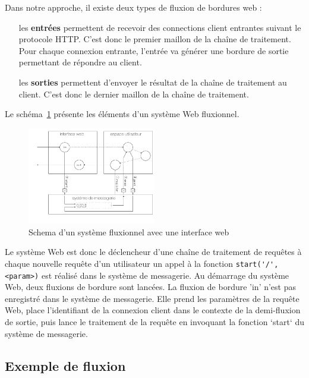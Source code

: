 Dans notre approche, il existe deux types de fluxion de bordures web :

\begin{itemize}
	\item[les \textbf{entrées}]
    permettent de recevoir des connections client entrantes suivant le protocole HTTP.
    C'est donc le premier maillon de la chaîne de traitement.
    Pour chaque connexion entrante, l'entrée va générer une bordure de sortie permettant de répondre au client.
	\item[les \textbf{sorties}]
    permettent d'envoyer le résultat de la chaîne de traitement au client.
    C'est donc le dernier maillon de la chaîne de traitement.
\end{itemize}


Le schéma~\ref{fig:schemaweb} présente les éléments d'un système Web fluxionnel.

\begin{figure}[h!]
	\includegraphics[width=0.5\textwidth]{schema-web.pdf}
	\caption{Schema d'un système fluxionnel avec une interface web}
	\label{fig:schemaweb}
\end{figure}

Le système Web est donc le déclencheur d'une chaîne de traitement de requêtes à chaque nouvelle requête d'un utilisateur un appel à la fonction \lstinline|start('/', <param>)| est réalisé dans le système de messagerie.
Au démarrage du système Web, deux fluxions de bordure sont lancées.
La fluxion de bordure 'in' n'est pas enregistré dans le système de messagerie.
Elle prend les paramètres de la requête Web, place l'identifiant de la connexion client dans le contexte de la demi-fluxion de sortie, puis lance le traitement de la requête en invoquant la fonction `start` du système de messagerie.

\subsection{Exemple de fluxion}

